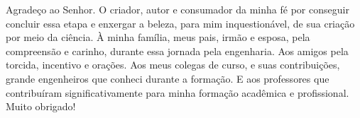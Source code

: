 \begin{agradecimentos}

Agradeço ao Senhor. O criador, autor e consumador da minha fé por conseguir concluir essa etapa e enxergar a beleza, para mim inquestionável, de sua criação por meio da ciência. À minha família, meus pais, irmão e esposa, pela compreensão e carinho, durante essa jornada pela engenharia. Aos amigos pela torcida, incentivo e orações. Aos meus colegas de curso, e suas contribuições, grande engenheiros que conheci durante a formação. E aos professores que contribuíram significativamente para minha formação acadêmica e profissional. Muito obrigado!

\end{agradecimentos}

